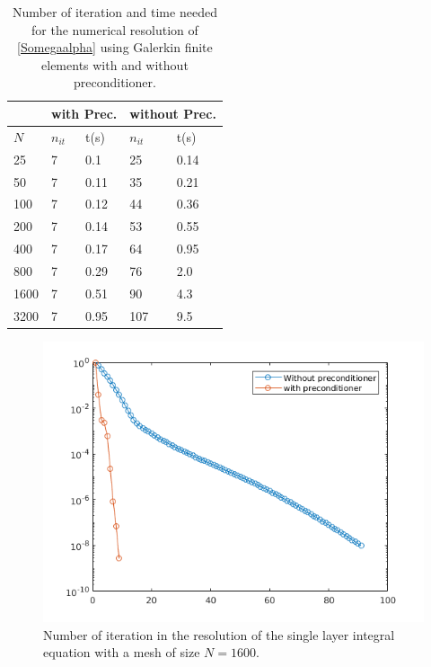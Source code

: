 \documentclass[a4paper]{article}
\begin{document}
		\begin{table}[H]
		\begin{center}
			\begin{tabular}{|| m{4em} | m{4em} | m{4em} | m{4em} | m{4em}||} 
				\hline
				\multicolumn{1}{||c|}{ }&
				\multicolumn{2}{c|}{with Prec.}&\multicolumn{2}{c||}{without Prec.}\\
				\hline
				$N$ & $n_{it}$& t(s) & $n_{it}$ & t(s)\\
				\hline\hline
				25 & 7 & 0.1 & 25 & 0.14\\ 
				\hline
				50 & 7 & 0.11 & 35 & 0.21\\
				\hline
				100 & 7 & 0.12 & 44 & 0.36\\
				\hline
				200 & 7 & 0.14 & 53 & 0.55\\
				\hline
				400 & 7 & 0.17 & 64 & 0.95\\
				\hline
				800 & 7 & 0.29 & 76 & 2.0 \\
				\hline
				1600 & 7 & 0.51 & 90 & 4.3\\
				\hline
				3200 & 7 & 0.95 & 107 & 9.5\\
				\hline
			\end{tabular}
		\end{center}
		\caption{Number of iteration and time needed for the numerical resolution of \eqref{Somegaalpha} using Galerkin finite elements with and without preconditioner.}
		\label{TableNitTimeLaplaceDirichlet}
	\end{table}
	\begin{figure}[H]
		\centering
		\includegraphics[scale=0.7]{figs/PrecondDirichletLaplaceSeg.png}
		\caption{Number of iteration in the resolution of the single layer integral equation with a mesh of size $N = 1600$.}
		\label{FigureNitLaplaceDirichlet}
	\end{figure}
	
\end{document}
